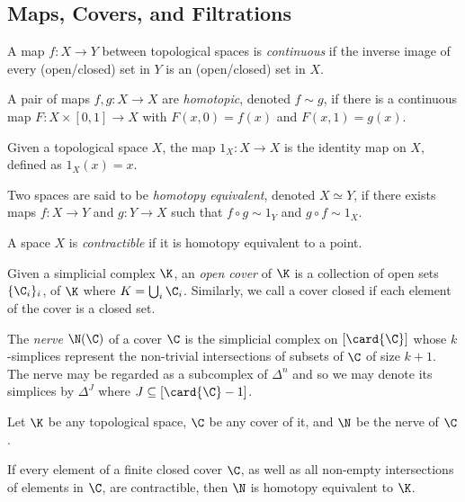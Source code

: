 \subsection{Maps, Covers, and Filtrations}
\begin{definition}
A map $f: X \rightarrow Y$ between topological spaces is \emph{continuous} if the inverse image of every (open/closed) set in $Y$ is an (open/closed) set in $X$. 
\end{definition}
\begin{definition}
A pair of maps $f,g: X \rightarrow X$ are \emph{homotopic}, denoted $f \sim g$, if there is a continuous map $F: X \times [0,1] \rightarrow X$ with $F(x,0) = f(x)$ and $F(x,1) = g(x)$. 
\end{definition}
\begin{definition}
Given a topological space $X$, the map $1_X : X \rightarrow X$ is the identity map on $X$, defined as $1_X(x) = x$.
\end{definition}
\begin{definition}
Two spaces are said to be \emph{homotopy equivalent}, denoted $X \simeq Y$, if there exists maps $f: X \rightarrow Y$ and $g: Y \rightarrow X$ such that $f \circ g \sim 1_Y$ and $g \circ f \sim 1_X$.
\end{definition}
\begin{definition}[Contractible]
A space $X$ is \emph{contractible} if it is homotopy equivalent to a point.
\end{definition}
\begin{definition}[Cover]
Given a simplicial complex $\K$, an \emph{open cover} of $\K$ is a collection of open sets $\{\C_i\}_i$, of $\K$ where $K = \bigcup_i \C_i$. Similarly, we call a cover closed if each element of the cover is a closed set.
\end{definition}
\begin{definition}[Nerve]
The \emph{nerve} $\N(\C)$ of a cover $\C$ is the simplicial complex on $[\card{\C}]$ whose $k$-simplices represent the non-trivial intersections of subsets of $\C$ of size $k+1$. The nerve may be regarded as a subcomplex of $\Delta^n$ and so we may denote its simplices by $\Delta^J$ where $J \subseteq [\card{\C}-1]$.
\end{definition}
Let $\K$ be any topological space, $\C$ be any cover of it, and $\N$ be the nerve of $\C$. 
\begin{lemma}
If every element of a finite closed cover $\C$, as well as all non-empty intersections of elements in $\C$, are contractible, then $\N$ is homotopy equivalent to $\K$.
\end{lemma}
